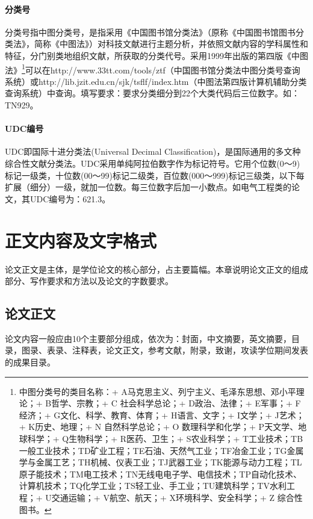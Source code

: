 \documentclass{cqupt_thesis}
\begin{document}
    \subsubsection{分类号}
    分类号指中图分类号，是指采用《中国图书馆分类法》（原称《中国图书馆图书分类法》，简称《中图法》）对科技文献进行主题分析，并依照文献内容的学科属性和特征，分门别类地组织文献，所获取的分类代号。采用1999年出版的第四版《中图法》\footnote{
        中图分类号的类目名称：+ A马克思主义、列宁主义、毛泽东思想、邓小平理论；+ B哲学、宗教；+ C 社会科学总论；+ D政治、法律；+ E军事；+ F经济；+ G文化、科学、教育、体育；+ H语言、文字；+ I文学；+ J艺术；+ K历史、地理；+ N 自然科学总论；+ O 数理科学和化学；+ P天文学、地球科学；+ Q生物科学；+ R医药、卫生；+ S农业科学；+ T工业技术；TB一般工业技术；TD矿业工程；TE石油、天然气工业；TF冶金工业；TG金属学与金属工艺；TH机械、仪表工业；TJ武器工业；TK能源与动力工程；TL原子能技术；TM电工技术；TN无线电电子学、电信技术；TP自动化技术、计算机技术；TQ化学工业；TS轻工业、手工业；TU建筑科学；TV水利工程；+ U交通运输；+ V航空、航天；+ X环境科学、安全科学；+ Z 综合性图书。}可以在http://www.33tt.com/tools/ztf（中国图书馆分类法中图分类号查询系统）或http://lib.jzit.edu.cn/sjk/tsflf/index.htm（中图法第四版计算机辅助分类查询系统）中查询。填写要求：要求分类细分到22个大类代码后三位数字。如：TN929。

    \subsubsection{UDC编号}
    UDC即国际十进分类法(Universal Decimal Classification)，是国际通用的多文种综合性文献分类法。UDC采用单纯阿拉伯数字作为标记符号。它用个位数(0～9)标记一级类，十位数(00～99)标记二级类，百位数(000～999)标记三级类，以下每扩展（细分）一级，就加一位数。每三位数字后加一小数点。如电气工程类的论文，其UDC编号为：621.3。


    \chapter{正文内容及文字格式}
    论文正文是主体，是学位论文的核心部分，占主要篇幅。本章说明论文正文的组成部分、写作要求和方法以及论文的字数要求。


    \section{论文正文}
    论文内容一般应由10个主要部分组成，依次为：封面，中文摘要，英文摘要，目录，图录、表录、注释表，论文正文，参考文献，附录，致谢，攻读学位期间发表的成果目录。
\end{document}
